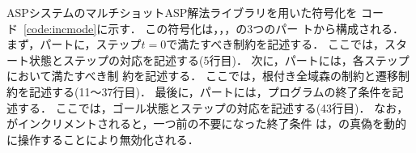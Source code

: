 ASPシステム{\clingo}のマルチショットASP解法ライブラリを用いた符号化を
コード~\ref{code:incmode}に示す．
この符号化は，，，の3つのパー
トから構成される．
%
まず，パートに，ステップ$t=0$で満たすべき制約を記述する．
ここでは，スタート状態とステップの対応を記述する(5行目)．
%
次に，パートには，各ステップにおいて満たすべき制
約を記述する．
ここでは，根付き全域森の制約と遷移制約を記述する(11〜37行目)．
%
最後に，パートには，プログラムの終了条件を記述する．
ここでは，ゴール状態とステップの対応を記述する(43行目)．
なお，がインクリメントされると，一つ前の不要になった終了条件
は，の真偽を動的に操作することにより無効化される．

